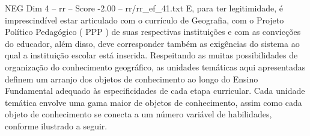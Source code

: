 \begin{textsample}{NEG Dim 4 – rr – Score -2.00 – rr/rr\_ef\_41.txt}
E, para ter legitimidade, é imprescindível estar articulado com o currículo de Geografia, com o Projeto Político Pedagógico ( PPP ) de suas respectivas instituições e com as convicções do educador, além disso, deve corresponder também as exigências do sistema ao qual a instituição escolar está inserida.
Respeitando as muitas possibilidades de organização do conhecimento geográfico, as unidades temáticas aqui apresentadas definem um arranjo dos objetos de conhecimento ao longo do Ensino Fundamental adequado às especificidades de cada etapa curricular.
Cada unidade temática envolve uma gama maior de objetos de conhecimento, assim como cada objeto de conhecimento se conecta a um número variável de habilidades, conforme ilustrado a seguir.

\end{textsample}
